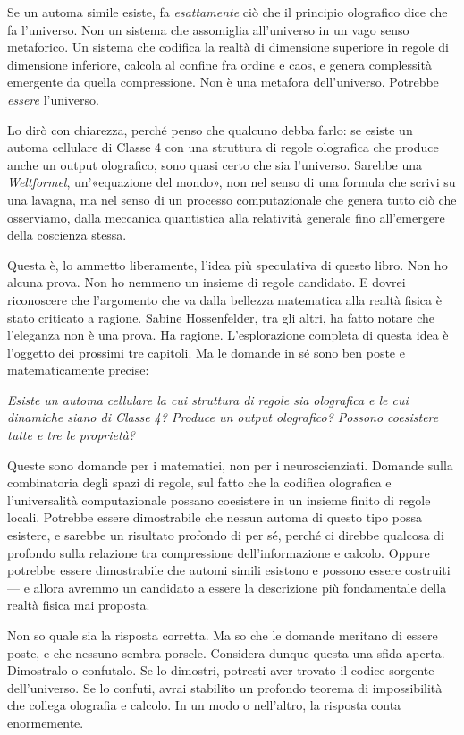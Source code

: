 \documentclass[11pt, twoside, openright]{book}
\begin{document}
Se un automa simile esiste, fa \textit{esattamente} ciò che il principio olografico dice che fa l'universo. Non un sistema che assomiglia all'universo in un vago senso metaforico. Un sistema che codifica la realtà di dimensione superiore in regole di dimensione inferiore, calcola al confine fra ordine e caos, e genera complessità emergente da quella compressione. Non è una metafora dell'universo. Potrebbe \textit{essere} l'universo.

Lo dirò con chiarezza, perché penso che qualcuno debba farlo: se esiste un automa cellulare di Classe 4 con una struttura di regole olografica che produce anche un output olografico, sono quasi certo che sia l'universo. Sarebbe una \textit{Weltformel}, un'«equazione del mondo», non nel senso di una formula che scrivi su una lavagna, ma nel senso di un processo computazionale che genera tutto ciò che osserviamo, dalla meccanica quantistica alla relatività generale fino all'emergere della coscienza stessa.

Questa è, lo ammetto liberamente, l'idea più speculativa di questo libro. Non ho alcuna prova. Non ho nemmeno un insieme di regole candidato. E dovrei riconoscere che l'argomento che va dalla bellezza matematica alla realtà fisica è stato criticato a ragione. Sabine Hossenfelder, tra gli altri, ha fatto notare che l'eleganza non è una prova. Ha ragione. L'esplorazione completa di questa idea è l'oggetto dei prossimi tre capitoli. Ma le domande in sé sono ben poste e matematicamente precise:

\textit{Esiste un automa cellulare la cui struttura di regole sia olografica e le cui dinamiche siano di Classe 4? Produce un output olografico? Possono coesistere tutte e tre le proprietà?}

Queste sono domande per i matematici, non per i neuroscienziati. Domande sulla combinatoria degli spazi di regole, sul fatto che la codifica olografica e l'universalità computazionale possano coesistere in un insieme finito di regole locali. Potrebbe essere dimostrabile che nessun automa di questo tipo possa esistere, e sarebbe un risultato profondo di per sé, perché ci direbbe qualcosa di profondo sulla relazione tra compressione dell'informazione e calcolo. Oppure potrebbe essere dimostrabile che automi simili esistono e possono essere costruiti --- e allora avremmo un candidato a essere la descrizione più fondamentale della realtà fisica mai proposta.

Non so quale sia la risposta corretta. Ma so che le domande meritano di essere poste, e che nessuno sembra porsele. Considera dunque questa una sfida aperta. Dimostralo o confutalo. Se lo dimostri, potresti aver trovato il codice sorgente dell'universo. Se lo confuti, avrai stabilito un profondo teorema di impossibilità che collega olografia e calcolo. In un modo o nell'altro, la risposta conta enormemente.
\end{document}

